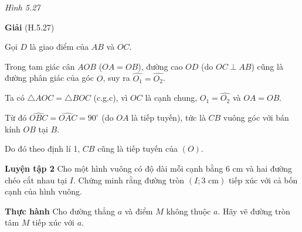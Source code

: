 \begin{lesson}
    \begin{center}

    \textit{Hình 5.27}
    \end{center}

    \textbf{Giải} (H.5.27)

    Gọi $D$ là giao điểm của $AB$ và $OC$.

    Trong tam giác cân $AOB$ ($OA=OB$), đường cao $OD$ (do $OC\perp AB$) cũng là đường phân giác của góc $O$, suy ra $\widehat{O_1}=\widehat{O_2}$.

    Ta có $\triangle AOC=\triangle BOC$ (c.g.c), vì $OC$ là cạnh chung, $\widehat{O_1}=\widehat{O_2}$ và $OA=OB$.

    Từ đó $\widehat{OBC}=\widehat{OAC}=90^\circ$ (do $OA$ là tiếp tuyến), tức là $CB$ vuông góc với bán kính $OB$ tại $B$.

    Do đó theo định lí 1, $CB$ cũng là tiếp tuyến của $(O)$.

    \textbf{Luyện tập 2} Cho một hình vuông có độ dài mỗi cạnh bằng 6 cm và hai đường chéo cắt nhau tại $I$. Chứng minh rằng đường tròn $(I;3\text{ cm})$ tiếp xúc với cả bốn cạnh của hình vuông.

    \answerline
    \answerline
    \answerline

    \textbf{Thực hành} Cho đường thẳng $a$ và điểm $M$ không thuộc $a$. Hãy vẽ đường tròn tâm $M$ tiếp xúc với $a$.

    \answerline
    \answerline
    \answerline


\end{lesson}
